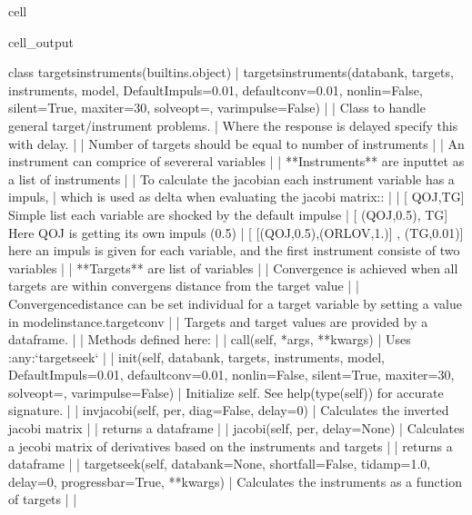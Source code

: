 \documentclass[letterpaper,10pt,english]{jupyterBook}
\begin{document}
\begin{sphinxuseclass}{cell}
\begin{sphinxVerbatimOutput}
\begin{sphinxuseclass}{cell_output}
\begin{sphinxVerbatim}[commandchars=\\\{\}]
class targets\PYGZus{}instruments(builtins.object)
 |  targets\PYGZus{}instruments(databank, targets, instruments, model, DefaultImpuls=0.01, defaultconv=0.01, nonlin=False, silent=True, maxiter=30, solveopt=\PYGZob{}\PYGZcb{}, varimpulse=False)
 |  
 |  Class to handle general target/instrument problems. 
 |  Where the response is delayed specify this with delay.
 |  
 |  Number of targets should be equal to number of instruments 
 |  
 |  An instrument can comprice of severeral variables
 |  
 |  **Instruments** are inputtet as a list of instruments
 |  
 |  To calculate the jacobian each instrument variable has a impuls, 
 |  which is used as delta when evaluating the jacobi matrix:: 
 |      
 |    [ \PYGZsq{}QO\PYGZus{}J\PYGZsq{},\PYGZsq{}TG\PYGZsq{}]   Simple list each variable are shocked by the default impulse 
 |    [ (\PYGZsq{}QO\PYGZus{}J\PYGZsq{},0.5), \PYGZsq{}TG\PYGZsq{}]  Here QO\PYGZus{}J is getting its own impuls (0.5)
 |    [ [(\PYGZsq{}QO\PYGZus{}J\PYGZsq{},0.5),(\PYGZsq{}ORLOV\PYGZsq{},1.)] , (\PYGZsq{}TG\PYGZsq{},0.01)] here an impuls is given for each variable, and the first instrument consiste of two variables 
 |  
 |  **Targets** are list of variables
 |  
 |  Convergence is achieved when all targets are within convergens distance from the target value
 |  
 |  Convergencedistance can be set individual for a target variable by setting a value in \PYGZlt{}modelinstance\PYGZgt{}.targetconv 
 |  
 |  Targets and target values are provided by a dataframe.
 |  
 |  Methods defined here:
 |  
 |  \PYGZus{}\PYGZus{}call\PYGZus{}\PYGZus{}(self, *args, **kwargs)
 |      Uses :any:`targetseek`
 |  
 |  \PYGZus{}\PYGZus{}init\PYGZus{}\PYGZus{}(self, databank, targets, instruments, model, DefaultImpuls=0.01, defaultconv=0.01, nonlin=False, silent=True, maxiter=30, solveopt=\PYGZob{}\PYGZcb{}, varimpulse=False)
 |      Initialize self.  See help(type(self)) for accurate signature.
 |  
 |  invjacobi(self, per, diag=False, delay=0)
 |      Calculates the inverted jacobi matrix
 |      
 |      returns a dataframe
 |  
 |  jacobi(self, per, delay=None)
 |      Calculates a jecobi matrix of derivatives based on the instruments and targets 
 |      
 |      returns a dataframe
 |  
 |  targetseek(self, databank=None, shortfall=False, ti\PYGZus{}damp=1.0, delay=0, progressbar=True, **kwargs)
 |      Calculates the instruments as a function of targets
 |  
 |  \PYGZhy{}\PYGZhy{}\PYGZhy{}\PYGZhy{}\PYGZhy{}\PYGZhy{}\PYGZhy{}\PYGZhy{}\PYGZhy{}\PYGZhy{}\PYGZhy{}\PYGZhy{}\PYGZhy{}\PYGZhy{}\PYGZhy{}\PYGZhy{}\PYGZhy{}\PYGZhy{}\PYGZhy{}\PYGZhy{}\PYGZhy{}\PYGZhy{}\PYGZhy{}\PYGZhy{}\PYGZhy{}\PYGZhy{}\PYGZhy{}\PYGZhy{}\PYGZhy{}\PYGZhy{}\PYGZhy{}\PYGZhy{}\PYGZhy{}\PYGZhy{}\PYGZhy{}\PYGZhy{}\PYGZhy{}\PYGZhy{}\PYGZhy{}\PYGZhy{}\PYGZhy{}\PYGZhy{}\PYGZhy{}\PYGZhy{}\PYGZhy{}\PYGZhy{}\PYGZhy{}\PYGZhy{}\PYGZhy{}\PYGZhy{}\PYGZhy{}\PYGZhy{}\PYGZhy{}\PYGZhy{}\PYGZhy{}\PYGZhy{}\PYGZhy{}\PYGZhy{}\PYGZhy{}\PYGZhy{}\PYGZhy{}\PYGZhy{}\PYGZhy{}\PYGZhy{}\PYGZhy{}\PYGZhy{}\PYGZhy{}\PYGZhy{}\PYGZhy{}\PYGZhy{}

\end{sphinxVerbatim}
\end{sphinxuseclass}
\end{sphinxVerbatimOutput}
\end{sphinxuseclass}
\end{document}
